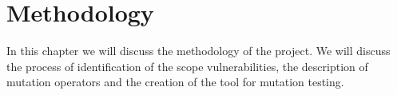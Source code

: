 \chapter{Methodology}

In this chapter we will discuss the methodology of the project. We will discuss the process of identification of the scope vulnerabilities, the description of mutation operators and the creation of the tool for mutation testing.

